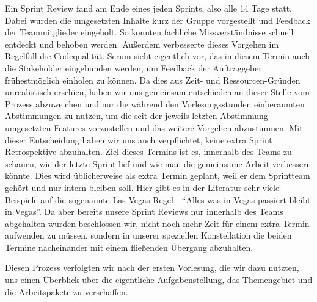  Ein Sprint Review fand am Ende eines jeden Sprints, also alle 14 Tage statt. Dabei wurden die umgesetzten Inhalte kurz der Gruppe vorgestellt und Feedback der Teammitglieder eingeholt. So konnten fachliche Missverständnisse schnell entdeckt und behoben werden. Außerdem verbesserte dieses Vorgehen im Regelfall die Codequalität. Scrum sieht eigentlich vor, das in diesem Termin auch die Stakeholder eingebunden werden, um Feedback der Auftraggeber frühestmöglich einholen zu können. Da dies aus Zeit- und Ressourcen-Gründen unrealistisch erschien, haben wir uns gemeinsam entschieden an dieser Stelle vom Prozess abzuweichen und nur die während den Vorlesungsstunden einberaumten Abstimmungen zu nutzen, um die seit der jeweils letzten Abstimmung umgesetzten Features vorzustellen und das weitere Vorgehen abzustimmen. Mit dieser Entscheidung haben wir uns auch verpflichtet, keine extra Sprint Retrospektive abzuhalten. Ziel dieses Termins ist es, innerhalb des Teams zu schauen, wie der letzte Sprint lief und wie man die gemeinsame Arbeit verbessern könnte. Dies wird üblicherweise  als extra Termin geplant, weil er dem Sprintteam gehört und nur intern bleiben soll. Hier gibt es in der Literatur sehr viele Beispiele auf die sogenannte Las Vegas Regel - \enquote{Alles was in Vegas passiert bleibt in Vegas}. 
 Da aber bereits unsere Sprint Reviews nur innerhalb des Teams abgehalten wurden beschlossen wir, nicht noch mehr Zeit für einem extra Termin aufwenden zu müssen, sondern in unserer speziellen Konstellation die beiden Termine nacheinander mit einem fließenden Übergang abzuhalten. 
 
Diesen Prozess verfolgten wir nach der ersten Vorlesung, die wir dazu nutzten, uns einen Überblick über die eigentliche Aufgabenstellung, das Themengebiet und die Arbeitspakete zu verschaffen. 